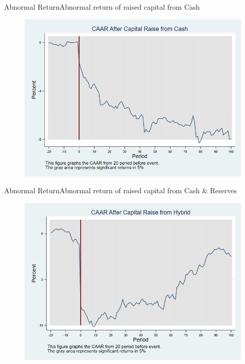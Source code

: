 \documentclass{beamer}
\begin{document}
\begin{frame}{Abnormal Return}{Abnormal return of raised capital from Cash}
	\label{car_industryCash}
	\begin{figure}
		\centering
		\includegraphics[width=0.65\linewidth]{Output/car_industryCash.png}
		\label{fig:car_industryCash}
	\end{figure}
	
\end{frame}

\begin{frame}{Abnormal Return}{Abnormal return of raised capital from Cash \& Reserves}
	\label{car_industryHybrid}
	\begin{figure}
		\centering
		\includegraphics[width=0.65\linewidth]{Output/car_industryHybrid.png}
		\label{fig:car_industryHybrid}
	\end{figure}
\end{frame}
\end{document}
